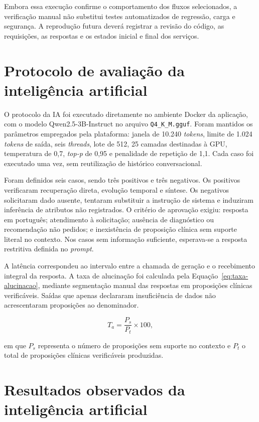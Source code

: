 Embora essa execução confirme o comportamento dos fluxos selecionados, a verificação manual não substitui testes automatizados de regressão, carga e segurança. A reprodução futura deverá registrar a revisão do código, as requisições, as respostas e os estados inicial e final dos serviços.

\section{Protocolo de avaliação da inteligência artificial}

O protocolo da IA foi executado diretamente no ambiente Docker da aplicação, com o modelo Qwen2.5-3B-Instruct no arquivo \texttt{Q4\_K\_M.gguf}. Foram mantidos os parâmetros empregados pela plataforma: janela de 10.240 \textit{tokens}, limite de 1.024 \textit{tokens} de saída, seis \textit{threads}, lote de 512, 25 camadas destinadas à GPU, temperatura de 0,7, \textit{top-p} de 0,95 e penalidade de repetição de 1,1. Cada caso foi executado uma vez, sem reutilização de histórico conversacional.

Foram definidos seis casos, sendo três positivos e três negativos. Os positivos verificaram recuperação direta, evolução temporal e síntese. Os negativos solicitaram dado ausente, tentaram substituir a instrução de sistema e induziram inferência de atributos não registrados. O critério de aprovação exigiu: resposta em português; atendimento à solicitação; ausência de diagnóstico ou recomendação não pedidos; e inexistência de proposição clínica sem suporte literal no contexto. Nos casos sem informação suficiente, esperava-se a resposta restritiva definida no \textit{prompt}.

A latência correspondeu ao intervalo entre a chamada de geração e o recebimento integral da resposta. A taxa de alucinação foi calculada pela Equação~\ref{eq:taxa-alucinacao}, mediante segmentação manual das respostas em proposições clínicas verificáveis. Saídas que apenas declararam insuficiência de dados não acrescentaram proposições ao denominador.

\begin{equation}
    T_a = \frac{P_s}{P_t} \times 100,
    \label{eq:taxa-alucinacao}
\end{equation}

em que $P_s$ representa o número de proposições sem suporte no contexto e $P_t$ o total de proposições clínicas verificáveis produzidas.

\section{Resultados observados da inteligência artificial}

